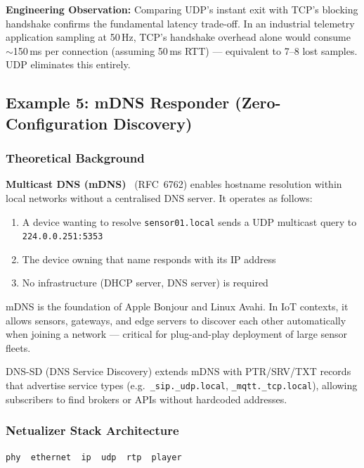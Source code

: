 \documentclass[12pt,a4paper]{article}
\begin{document}
\textbf{Engineering Observation:} Comparing UDP's instant exit with TCP's
blocking handshake confirms the fundamental latency trade-off. In an
industrial telemetry application sampling at 50\,Hz, TCP's handshake overhead
alone would consume $\sim$150\,ms per connection (assuming 50\,ms RTT) ---
equivalent to 7--8 lost samples. UDP eliminates this entirely.

\subsection{Example 5: mDNS Responder (Zero-Configuration Discovery)}
\label{sec:mdns}

\subsubsection*{Theoretical Background}

\textbf{Multicast DNS (mDNS)}~\cite{RFC6762} (RFC~6762) enables hostname
resolution within local networks without a centralised DNS server. It operates
as follows:
\begin{enumerate}[nosep]
  \item A device wanting to resolve \texttt{sensor01.local} sends a UDP
    multicast query to \texttt{224.0.0.251:5353}
  \item The device owning that name responds with its IP address
  \item No infrastructure (DHCP server, DNS server) is required
\end{enumerate}

mDNS is the foundation of Apple Bonjour and Linux Avahi. In IoT contexts, it
allows sensors, gateways, and edge servers to discover each other
automatically when joining a network --- critical for plug-and-play deployment
of large sensor fleets.

DNS-SD (DNS Service Discovery) extends mDNS with PTR/SRV/TXT records that
advertise service types (e.g.\ \texttt{\_sip.\_udp.local},
\texttt{\_mqtt.\_tcp.local}), allowing subscribers to find brokers or APIs
without hardcoded addresses.

\subsubsection*{Netualizer Stack Architecture}

\begin{center}
  \texttt{phy \textrightarrow\ ethernet \textrightarrow\ ip \textrightarrow\ udp \textrightarrow\ rtp \textrightarrow\ player}
\end{center}
\end{document}
